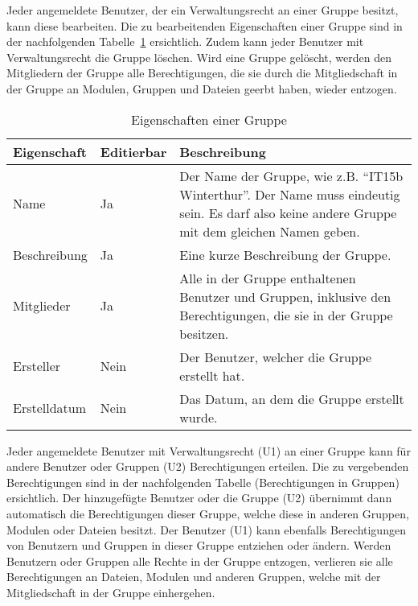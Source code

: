 Jeder angemeldete Benutzer, der ein Verwaltungsrecht an einer Gruppe besitzt, kann diese bearbeiten. Die zu bearbeitenden Eigenschaften einer Gruppe sind in der nachfolgenden Tabelle~\ref{tab:gruppe_eigenschaften} ersichtlich. Zudem kann jeder Benutzer mit Verwaltungsrecht die Gruppe löschen. Wird eine Gruppe gelöscht, werden den Mitgliedern der Gruppe alle Berechtigungen, die sie durch die Mitgliedschaft in der Gruppe an Modulen, Gruppen und Dateien geerbt haben, wieder entzogen.

\begin{table}[H]
\begin{tabularx}{\textwidth}{|l|l|X|} \hline
\textbf{Eigenschaft} &\textbf{Editierbar} & \textbf{Beschreibung} \\ \hline
Name				& Ja 	& Der Name der Gruppe, wie z.B. “IT15b Winterthur”. Der Name muss eindeutig sein. Es darf also keine andere Gruppe mit dem gleichen Namen geben.\\ \hline
Beschreibung		& Ja 	& Eine kurze Beschreibung der Gruppe.\\ \hline
Mitglieder			& Ja 	& Alle in der Gruppe enthaltenen Benutzer und Gruppen, inklusive den Berechtigungen, die sie in der Gruppe besitzen.\\ \hline
Ersteller	 		& Nein 	& Der Benutzer, welcher die Gruppe erstellt hat.\\ \hline
Erstelldatum		& Nein 	& Das Datum, an dem die Gruppe erstellt wurde.\\ \hline
\end{tabularx}
\caption{Eigenschaften einer Gruppe}
\label{tab:gruppe_eigenschaften}
\end{table}

Jeder angemeldete Benutzer mit Verwaltungsrecht (U1) an einer Gruppe kann für andere Benutzer oder Gruppen (U2) Berechtigungen erteilen. Die zu vergebenden Berechtigungen sind in der nachfolgenden Tabelle (Berechtigungen in Gruppen) ersichtlich. Der hinzugefügte Benutzer oder die Gruppe (U2) übernimmt dann automatisch die Berechtigungen dieser Gruppe, welche diese in anderen Gruppen, Modulen oder Dateien besitzt.
Der Benutzer (U1) kann ebenfalls Berechtigungen von Benutzern und Gruppen in dieser Gruppe entziehen oder ändern. Werden Benutzern oder Gruppen alle Rechte in der Gruppe entzogen, verlieren sie alle Berechtigungen an Dateien, Modulen und anderen Gruppen, welche mit der Mitgliedschaft in der Gruppe einhergehen.


